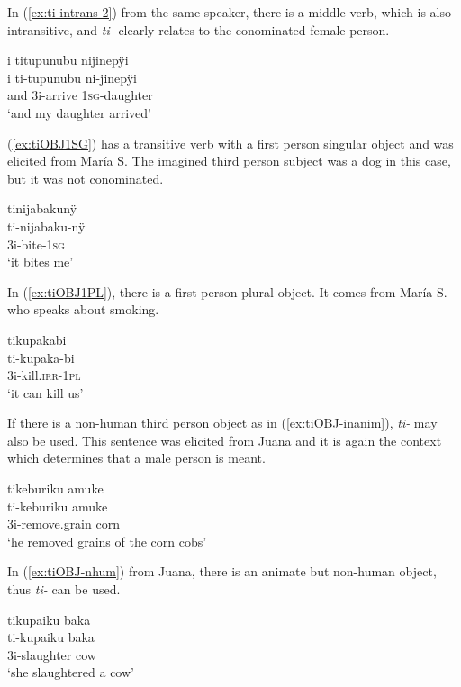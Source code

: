 In (\ref{ex:ti-intrans-2}) from the same speaker, there is a middle verb, which is also intransitive, and \textit{ti-} clearly relates to the conominated female person.

\ea\label{ex:ti-intrans-2}
\begingl
\glpreamble i titupunubu nijinepÿi\\
\gla i ti-tupunubu ni-jinepÿi\\
\glb and 3i-arrive 1\textsc{sg}-daughter\\
\glft ‘and my daughter arrived’
\endgl
\trailingcitation{[jxx-p120430l-1.267]}
\xe

(\ref{ex:tiOBJ1SG}) has a transitive verb with a first person singular object and was elicited from María S. The imagined third person subject was a dog in this case, but it was not conominated.

\ea\label{ex:tiOBJ1SG}
\begingl 
\glpreamble tinijabakunÿ\\
\gla ti-nijabaku-nÿ\\ 
\glb 3i-bite-1\textsc{sg}\\ 
\glft ‘it bites me’\\ 
\endgl
\trailingcitation{[rxx-e181018le]}
\xe

In (\ref{ex:tiOBJ1PL}), there is a first person plural object. It comes from María S. who speaks about smoking.

\ea\label{ex:tiOBJ1PL}
\begingl
\glpreamble tikupakabi\\
\gla ti-kupaka-bi\\
\glb 3i-kill.\textsc{irr}-1\textsc{pl}\\
\glft ‘it can kill us’
\endgl
\trailingcitation{[rxx-e120511l.385]}
\xe

If there is a non-human third person object as in (\ref{ex:tiOBJ-inanim}), \textit{ti-} may also be used. This sentence was elicited from Juana and it is again the context which determines that a male person is meant.

\ea\label{ex:tiOBJ-inanim}
\begingl 
\glpreamble tikeburiku amuke\\
\gla ti-keburiku amuke\\ 
\glb 3i-remove.grain corn\\ 
\glft ‘he removed grains of the corn cobs’\\ 
\endgl
\trailingcitation{[jxx-e110923l-1.050]}
\xe

In (\ref{ex:tiOBJ-nhum}) from Juana, there is an animate but non-human object, thus \textit{ti-} can be used.

\ea\label{ex:tiOBJ-nhum}
\begingl
\glpreamble tikupaiku baka\\
\gla ti-kupaiku baka\\
\glb 3i-slaughter cow\\
\glft ‘she slaughtered a cow’
\endgl
\trailingcitation{[jxx-p120515l-2.097]}
\xe
 

